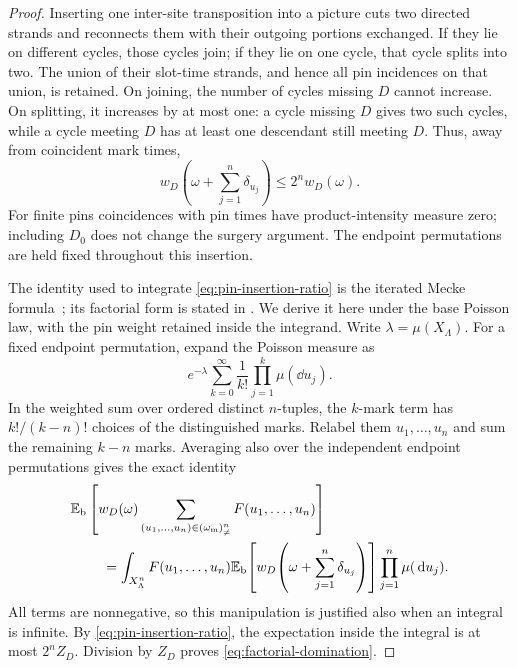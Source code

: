 \begin{proof}
Inserting one inter-site transposition into a picture cuts two
directed strands and reconnects them with their outgoing portions
exchanged.  If they lie on different cycles, those cycles join; if
they lie on one cycle, that cycle splits into two.  The union of
their slot-time strands, and hence all pin incidences on that
union, is retained.  On joining, the number of cycles missing $D$
cannot increase.  On splitting, it increases by at most one: a
cycle missing $D$ gives two such cycles, while a cycle meeting $D$
has at least one descendant still meeting $D$.  Thus, away from
coincident mark times,
\begin{equation}\label{eq:pin-insertion-ratio}
 w_D\!\left(\omega+\sum_{j=1}^n\delta_{u_j}\right)
       \le 2^n w_D(\omega).
\end{equation}
For finite pins coincidences with pin times have product-intensity
measure zero; including $D_0$ does not change the surgery argument.
The endpoint permutations are held fixed throughout this insertion.

The identity used to integrate \eqref{eq:pin-insertion-ratio} is the
iterated Mecke formula~\cite{Mecke1967}; its factorial form is stated in
\cite[Theorem~4.4]{LastPenrose2017}.  We derive it here under the base
Poisson law, with the pin weight retained inside the integrand.  Write $\lambda=\mu(X_\Lambda)$.
For a fixed endpoint permutation, expand the Poisson measure as
\[
 e^{-\lambda}\sum_{k=0}^{\infty}\frac1{k!}
                      \prod_{j=1}^k\mu(\dd u_j).
\]
In the weighted sum over ordered distinct $n$-tuples, the $k$-mark
term has $k!/(k-n)!$ choices of the distinguished marks.  Relabel
them $u_1,\ldots,u_n$ and sum the remaining $k-n$ marks.  Averaging
also over the independent endpoint permutations gives the exact
identity
\begin{align*}
 &\mathbb E_{\mathrm b}\left[
       w_D(\omega)
       \sum_{(u_1,\ldots,u_n)\in(\omega_{\mathrm m})^n_{\ne}}
                    F(u_1,\ldots,u_n)\right]\\
 &\hspace{8mm}=
   \int_{X_\Lambda^n}F(u_1,\ldots,u_n)
       \mathbb E_{\mathrm b}\!\left[
          w_D\!\left(\omega+\sum_{j=1}^n\delta_{u_j}\right)\right]
             \prod_{j=1}^n\mu(\,\mathrm d u_j).
\end{align*}
All terms are nonnegative, so this manipulation is justified also
when an integral is infinite.  By \eqref{eq:pin-insertion-ratio},
the expectation inside the integral is at most $2^n Z_D$.
Division by $Z_D$ proves \eqref{eq:factorial-domination}.
\end{proof}

